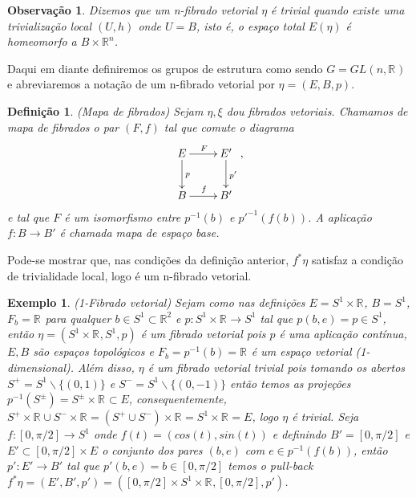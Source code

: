 \documentclass[12pt]{book}
\newtheorem{definicao}[teorema]{Definição}
\newtheorem{exemplo}[teorema]{Exemplo}
\newtheorem{observacao}[teorema]{Observação}
\newcommand{\real}[1]{\mathbb{R}^{#1}}
\begin{document}
	\begin{observacao}\label{observacao_fibrado_vetorial_trivial}
		Dizemos que um n-fibrado vetorial $\eta$ é trivial quando existe uma trivialização local $(U, h)$ onde $U = B$, isto é, o espaço total $E(\eta)$ é homeomorfo a $B\times \real{n}$.
	\end{observacao}
	
	Daqui em diante definiremos os grupos de estrutura como sendo $G = GL(n,\real{})$ e abreviaremos a notação de um n-fibrado vetorial por $\eta = (E,B,p)$.
	
	\begin{definicao}
		(Mapa de fibrados) Sejam $\eta, \xi$ dou fibrados vetoriais. Chamamos de mapa de fibrados o par $(F, f)$ tal que comute o diagrama
		$$
		\xymatrix{
			E \ar[r]^{F}\ar[d]^{p} & E'\ar[d]^{p'}
			\\
			B\ar[r]^{f} & B'
		},
		$$
		e tal que $F$ é um isomorfismo entre $p^{-1}(b)$ e $p'^{-1}(f(b))$. A aplicação $f:B\to B'$ é chamada mapa de espaço base.
	\end{definicao}
	
	Pode-se mostrar que, nas condições da definição anterior, $f^{*}\eta$ satisfaz a condição de trivialidade local, logo é um n-fibrado vetorial.
	
	\begin{exemplo}
		(1-Fibrado vetorial) Sejam como nas definições $E=S^{1} \times \real{}$, $B=S^{1}$, $F_{b} = \real{}$ para qualquer $b \in S^{1}\subset \real{2}$ e $p:S^{1} \times \real{}\to S^{1}$ tal que $p(b, e)=p \in S^{1}$, então $\eta=(S^{1} \times \real{}, S^{1}, p)$ é um fibrado vetorial pois $p$ é uma aplicação contínua, $E, B$ são espaços topológicos e $F_{b} = p^{-1}(b) = \real{}$ é um espaço vetorial (1-dimensional). Além disso, $\eta$ é um fibrado vetorial trivial pois tomando os abertos $S^{+} = S^{1} \backslash \{(0,1)\}$ e $S^{-} = S^{1} \backslash \{(0,-1)\}$ então temos as projeções $p^{-1}(S^{\pm}) = S^{\pm} \times \real{} \subset E$, consequentemente, $S^{+}\times\real{} \cup S^{-}\times\real{} = (S^{+}\cup S^{-})\times\real{} = S^{1} \times\real{} =E$, logo $\eta$ é trivial. Seja $f:[0,\pi/2] \to S^{1}$ onde $f(t) = (cos(t), sin(t))$ e definindo $B' =[0,\pi/2]$ e $E' \subset [0,\pi/2]\times E$ o conjunto dos pares $(b, e)$ com $e \in p^{-1}(f(b))$, então $p': E'\to B'$ tal que $p'(b, e) = b \in [0,\pi/2]$ temos o pull-back $f^{*}\eta = (E', B', p') = ([0,\pi/2]\times S^{1}\times \real{}, [0,\pi/2], p')$.
	\end{exemplo}
	
\end{document}
